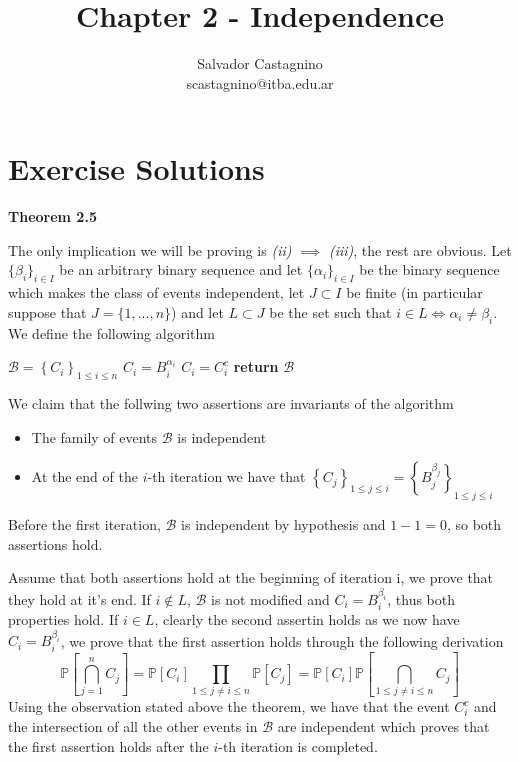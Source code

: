 \documentclass{article}
\author{Salvador Castagnino \\ scastagnino@itba.edu.ar}
\date{}
\title{Chapter 2 - Independence}
\begin{document}
\maketitle 

\section*{Exercise Solutions}

\begin{exercise}\textbf{Theorem 2.5}

	The only implication we will be proving is \textit{(ii)} $\implies$ \textit{(iii)}, the rest are obvious. Let $\{\beta_i\}_{i \in I}$ be an arbitrary binary sequence and let $\{\alpha_i\}_{i \in I}$ be the binary sequence which makes the class of events independent, let $J \subset I$ be finite (in particular suppose that $J = \{1,...,n\}$) and let $L \subset J$ be the set such that $i \in L \iff \alpha_i \neq \beta_i$. We define the following algorithm

	\bigbreak

	\begin{algorithmic}
		\State $\mathcal{B}=\left\{C_i\right\}_{1 \le i \le n}$
		\State $C_i = B_i^{\alpha_i}$
		\EndFor
		\State $C_i = C_i^c$
		\EndIf
		\EndFor
		\State \textbf{return} $\mathcal{B}$
	\end{algorithmic}

	\bigbreak

	We claim that the follwing two assertions are invariants of the algorithm
	\begin{itemize}
		\item The family of events $\mathcal{B}$ is independent
		\item At the end of the $i$-th iteration we have that $\left\{C_j\right\}_{1 \le j \le i} = \left\{B_j^{\beta_j}\right\}_{1 \le j \le i}$
	\end{itemize}

	Before the first iteration, $\mathcal{B}$ is independent by hypothesis and $1-1=0$, so both assertions hold.

	Assume that both assertions hold at the beginning of iteration i, we prove that they hold at it's end. If $i \not\in L$, $\mathcal{B}$ is not modified and $C_i = B_i^{\beta_i}$, thus both properties hold. If $i \in L$, clearly the second assertin holds as we now have $C_i = B_i^{\beta_i}$, we prove that the first assertion holds through the following derivation
	\[
		\mathbb{P}\left[\bigcap_{j = 1}^n C_j \right] = \mathbb{P}\left[C_i\right] \prod_{1 \le j \neq i \le n} \mathbb{P}\left[C_j\right] = 
		\mathbb{P}\left[C_i\right] \mathbb{P}\left[\bigcap_{1 \le j \neq i \le n}C_j\right]
	\]
	Using the observation stated above the theorem, we have that the event $C_i^c$ and the intersection of all the other events in $\mathcal{B}$ are independent which proves that the first assertion holds after the $i$-th iteration is completed.


\end{exercise}
\end{document}
